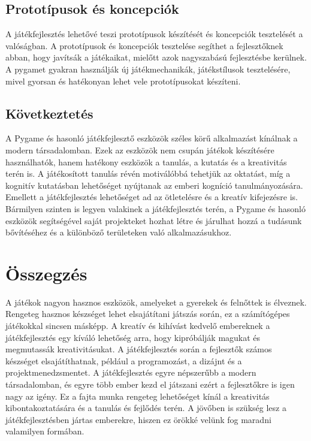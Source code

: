 \subsection{Prototípusok és koncepciók}
A játékfejlesztés lehetővé teszi prototípusok készítését és koncepciók tesztelését a valóságban. A prototípusok és koncepciók tesztelése segíthet a fejlesztőknek abban, hogy javítsák a játékaikat, mielőtt azok nagyszabású fejlesztésbe kerülnek. A pygamet gyakran használják új játékmechanikák, játékstílusok tesztelésére, mivel gyorsan és hatékonyan lehet vele prototípusokat készíteni.

\subsection{Következtetés}

A Pygame és hasonló játékfejlesztő eszközök széles körű alkalmazást kínálnak a modern társadalomban. Ezek az eszközök nem csupán játékok készítésére használhatók, hanem hatékony eszközök a tanulás, a kutatás és a kreativitás terén is. A játékosított tanulás révén motiválóbbá tehetjük az oktatást, míg a kognitív kutatásban lehetőséget nyújtanak az emberi kogníció tanulmányozására. Emellett a játékfejlesztés lehetőséget ad az ötletelésre és a kreatív kifejezésre is. Bármilyen szinten is legyen valakinek a játékfejlesztés terén, a Pygame és hasonló eszközök segítségével saját projekteket hozhat létre és járulhat hozzá a tudásunk bővítéséhez és a különböző területeken való alkalmazásukhoz.


\section{Összegzés}

A játékok nagyon hasznos eszközök, amelyeket a gyerekek és felnőttek is élveznek. Rengeteg hasznos készséget lehet elsajátítani játszás során, ez a számítógépes játékokkal sincsen másképp. A kreatív és kihívást kedvelő embereknek a játékfejlesztés egy kíváló lehetőség arra, hogy kipróbálják magukat és megmutassák kreativitásukat. A játékfejlesztés során a fejlesztők számos készséget elsajátíthatnak, például a programozást, a dizájnt és a projektmenedzsmentet. A játékfejlesztés egyre népszerűbb a modern társadalomban, és egyre több ember kezd el játszani ezért a fejlesztőkre is igen nagy az igény. Ez a fajta munka rengeteg lehetőséget kínál a kreativitás kibontakoztatására és a tanulás és fejlődés terén. A jövőben is szükség lesz a játékfejlesztésben jártas emberekre, hiszen ez örökké velünk fog maradni valamilyen formában.